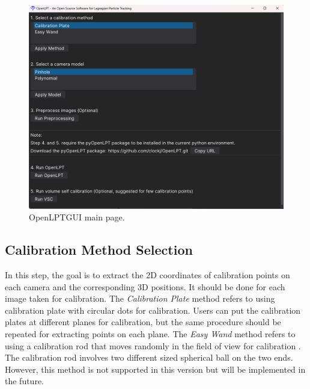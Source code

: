 \documentclass[a4paper,fleqn]{article}
\begin{document}
\begin{figure}[h]
    \centering
    \includegraphics[width=\linewidth]{Fig/GUI_main.png}
    \caption{OpenLPTGUI main page.}
    \label{fig:GUI_main}
\end{figure}


\subsection{Calibration Method Selection}
In this step, the goal is to extract the 2D coordinates of calibration points on each camera and the corresponding 3D positions. It should be done for each image taken for calibration. The \textit{Calibration Plate} method refers to using calibration plate with circular dots for calibration. Users can put the calibration plates at different planes for calibration, but the same procedure should be repeated for extracting points on each plane. The \textit{Easy Wand} method refers to using a calibration rod that moves randomly in the field of view for calibration \citep{theriault2014protocol}. The calibration rod involves two different sized spherical ball on the two ends. However, this method is not supported in this version but will be implemented in the future.
\end{document}
